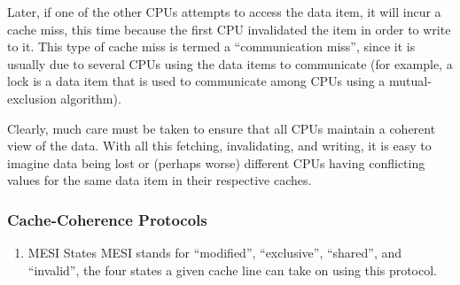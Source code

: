 \documentclass[11pt]{article}
\begin{document}
Later, if one of the other CPUs attempts to access the data item, it will incur a cache miss,
this time because the first CPU invalidated the item in order to write to it. This type of cache
miss is termed a “communication miss”, since it is usually due to several CPUs using the data
items to communicate (for example, a lock is a data item that is used to communicate among CPUs
using a mutual-exclusion algorithm).

Clearly, much care must be taken to ensure that all CPUs maintain a coherent view of the data.
With all this fetching, invalidating, and writing, it is easy to imagine data being lost or
(perhaps worse) different CPUs having conflicting values for the same data item in their
respective caches.
\subsubsection{Cache-Coherence Protocols}
\label{sec:orgdaaf6d5}
\begin{enumerate}
\item MESI States
\label{sec:org11fe8e5}
MESI stands for ``modified'', ``exclusive'', ``shared'', and ``invalid'', the four states a given cache
line can take on using this protocol.
\end{enumerate}
\end{document}
